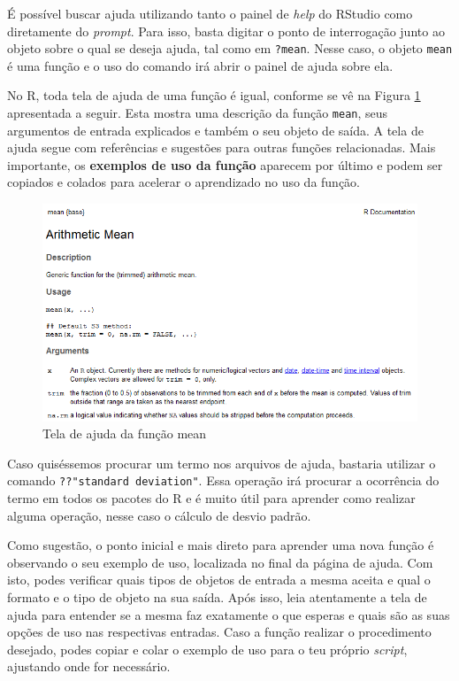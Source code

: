 \documentclass[
  11pt,
]{book}
\begin{document}
É possível buscar ajuda utilizando tanto o painel de \emph{help} do RStudio como diretamente do \emph{prompt}. Para isso, basta digitar o ponto de interrogação junto ao objeto sobre o qual se deseja ajuda, tal como em \texttt{?mean}. Nesse caso, o objeto \texttt{mean} é uma função e o uso do comando irá abrir o painel de ajuda sobre ela. 

No R, toda tela de ajuda de uma função é igual, conforme se vê na Figura \ref{fig:ExemploAjuda} apresentada a seguir. Esta mostra uma descrição da função \texttt{mean}, seus argumentos de entrada explicados e também o seu objeto de saída. A tela de ajuda segue com referências e sugestões para outras funções relacionadas. Mais importante, os \textbf{exemplos de uso da função} aparecem por último e podem ser copiados e colados para acelerar o aprendizado no uso da função.

\begin{figure}[!htbp]

{\centering \includegraphics[width=1\linewidth]{00-text-resources/figs/ExemploAjuda} 

}

\caption{Tela de ajuda da função mean}\label{fig:ExemploAjuda}
\end{figure}

Caso quiséssemos procurar um termo nos arquivos de ajuda, bastaria utilizar o comando \texttt{??"standard\ deviation"}. Essa operação irá procurar a ocorrência do termo em todos os pacotes do R e é muito útil para aprender como realizar alguma operação, nesse caso o cálculo de desvio padrão.

Como sugestão, o ponto inicial e mais direto para aprender uma nova função é observando o seu exemplo de uso, localizada no final da página de ajuda. Com isto, podes verificar quais tipos de objetos de entrada a mesma aceita e qual o formato e o tipo de objeto na sua saída. Após isso, leia atentamente a tela de ajuda para entender se a mesma faz exatamente o que esperas e quais são as suas opções de uso nas respectivas entradas. Caso a função realizar o procedimento desejado, podes copiar e colar o exemplo de uso para o teu próprio \emph{script}, ajustando onde for necessário.
\end{document}
